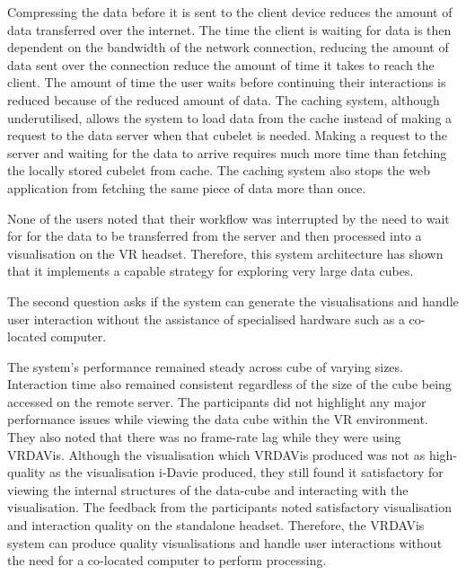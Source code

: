 Compressing the data before it is sent to the client device reduces the amount of data transferred over the internet.
The time the client is waiting for data is then dependent on the bandwidth of the network connection, reducing the amount of data sent over the connection reduce the amount of time it takes to reach the client.
The amount of time the user waits before continuing their interactions is reduced because of the reduced amount of data.
The caching system, although underutilised, allows the system to load data from the cache instead of making a request to the data server when that cubelet is needed.
Making a request to the server and waiting for the data to arrive requires much more time than fetching the locally stored cubelet from cache.
The caching system also stops the web application from fetching the same piece of data more than once.

None of the users noted that their workflow was interrupted by the need to wait for for the data to be transferred from the server and then processed into a visualisation on the VR headset.
Therefore, this system architecture has shown that it implements a capable strategy for exploring very large data cubes.

The second question asks if the system can generate the visualisations and handle user interaction without the assistance of specialised hardware such as a co-located computer.

The system's performance remained steady across cube of varying sizes.
Interaction time also remained consistent regardless of the size of the cube being accessed on the remote server.
The participants did not highlight any major performance issues while viewing the data cube within the VR environment.
They also noted that there was no frame-rate lag while they were using VRDAVis.
Although the visualisation which VRDAVis produced was not as high-quality as the visualisation i-Davie produced, they still found it satisfactory for viewing the internal structures of the data-cube and interacting with the visualisation.
The feedback from the participants noted satisfactory visualisation and interaction quality on the standalone headset.
Therefore, the VRDAVis system can produce quality visualisations and handle user interactions without the need for a co-located computer to perform processing.

